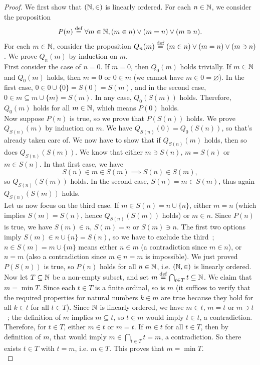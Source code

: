 \begin{proof}
    We first show that $(\operatorname{\mathbb N},\in)$ is linearly ordered. For each $n \in \operatorname{\mathbb N}$, we consider the proposition 
    \[
        P(n) \overset{\mathrm{def}}{=} \forall m \in \operatorname{\mathbb N}, (m \in n) \vee (m = n) \vee (m \ni n). 
    \]
    For each $m \in \operatorname{\mathbb N}$, consider the proposition $Q_n(m) \overset{\mathrm{def}}{=} (m \in n) \vee (m = n) \vee (m \ni n)$. We prove $Q_n(m)$ by induction on $m$. 
    \\

    First consider the case of $n = 0$. If $m = 0$, then $Q_0(m)$ holds trivially. If $m \in \operatorname{\mathbb N}$ and $Q_0(m)$ holds, then $m = 0$ or $0 \in m$ (we cannot have $m \in 0 = \varnothing$). In the first case, $0 \in 0 \cup \{0\} = S(0) = S(m)$, and in the second case, $0 \in m \subseteq m \cup \{m\} = S(m)$. In any case, $Q_0(S(m))$ holds. Therefore, $Q_0(m)$ holds for all $m \in \operatorname{\mathbb N}$, which means $P(0)$ holds.
    \\

    Now suppose $P(n)$ is true, so we prove that $P(S(n))$ holds. We prove $Q_{S(n)}(m)$ by induction on $m$. We have $Q_{S(n)}(0) = Q_0(S(n))$, so that's already taken care of. We now have to show that if $Q_{S(n)}(m)$ holds, then so does $Q_{S(n)}(S(m))$. We know that either $m \ni S(n)$, $m = S(n)$ or $m \in S(n)$. In that first case, we have
    \[
        S(n) \in m \in S(m) \implies S(n) \in S(m),
    \]
    so $Q_{S(n)}(S(m))$ holds. In the second case, $S(n) = m \in S(m)$, thus again $Q_{S(n)}(S(m))$ holds. 
    \\
    
    Let us now focus on the third case. If $m \in S(n) = n \cup \{n\}$, either $m = n$ (which implies $S(m) = S(n)$, hence $Q_{S(n)}(S(m))$ holds) or $m \in n$. Since $P(n)$ is true, we have $S(m) \in n$, $S(m) = n$ or $S(m) \ni n$. The first two options imply $S(m) \in n \cup \{n\} = S(n)$, so we have to exclude the third~; $n \in S(m) = m \cup \{m\}$ means either $n \in m$ (a contradiction since $m \in n$), or $n = m$ (also a contradiction since $m \in n = m$ is impossible). We just proved $P(S(n))$ is true, so $P(n)$ holds for all $n \in \operatorname{\mathbb N}$, i.e. $(\operatorname{\mathbb N},\in)$ is linearly ordered. 
    \\
    
    Now let $T \subseteq \operatorname{\mathbb N}$ be a non-empty subset, and set $m \overset{\mathrm{def}}{=} \bigcap_{t \in T} t \subseteq \operatorname{\mathbb N}$. We claim that $m = \min T$. Since each $t \in T$ is a finite ordinal, so is $m$ (it suffices to verify that the required properties for natural numbers $k \in m$ are true because they hold for all $k \in t$ for all $t \in T$). Since $\operatorname{\mathbb N}$ is linearly ordered, we have $m \in t$, $m=t$ or $m \ni t$~; the definition of $m$ implies $m \subseteq t$, so $t \in m$ would imply $t \in t$, a contradiction. Therefore, for $t \in T$, either $m \in t$ or $m = t$. If $m \in t$ for all $t \in T$, then by definition of $m$, that would imply $m \in \bigcap_{t \in T} t = m$, a contradiction. So there exists $t \in T$ with $t = m$, i.e. $m \in T$. This proves that $m = \min T$.  
    \\


\end{proof}
